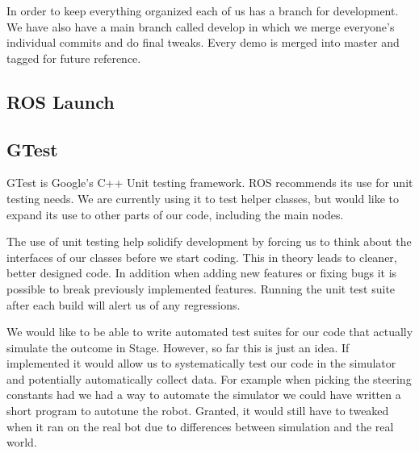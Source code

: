 In order to keep everything organized each of us has a branch for
development.  We have also have a main branch called develop in which
we merge everyone's individual commits and do final tweaks. Every
demo is merged into master and tagged for future reference.

\subsection{ROS Launch}



\subsection{GTest}

GTest is Google's C++ Unit testing
framework.\cite{google_googletest} ROS recommends
its use for unit testing needs.  We are currently using it to test
helper classes, but would like to expand its use to other parts of our
code, including the main nodes.

The use of unit testing help solidify development by forcing us to
think about the interfaces of our classes before we start coding.
This in theory leads to cleaner, better designed code.  In addition
when adding new features or fixing bugs it is possible to break
previously implemented features.  Running the unit test suite after
each build will alert us of any regressions.

We would like to be able to write automated test suites for our code
that actually simulate the outcome in Stage. However, so far this is
just an idea.  If implemented it would allow us to systematically test
our code in the simulator and potentially automatically collect data.
For example when picking the steering constants had we had a way to
automate the simulator we could have written a short program to
autotune the robot.  Granted, it would still have to tweaked when it
ran on the real bot due to differences between simulation and the real world.
